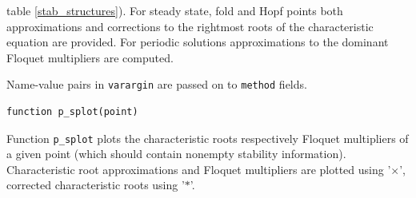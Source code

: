 \documentclass[10pt]{scrartcl}
\newcommand{\blist}[1]{\mbox{\lstinline!#1!}}
\begin{document}
{\begin{itemize}
  table \ref{stab_structures}).  For steady state, fold and Hopf
  points both approximations and corrections to the rightmost roots of
  the characteristic equation are provided.  For periodic solutions
  approximations to the dominant Floquet multipliers are computed.
\end{itemize}
Name-value pairs in \blist{varargin} are passed on to \blist{method} fields.
\begin{lstlisting}
function p_splot(point)  
\end{lstlisting}
\noindent Function \blist{p_splot} plots the characteristic roots
respectively Floquet multipliers of a given point (which should
contain nonempty stability information).  Characteristic root
approximations and Floquet multipliers are plotted using '$\times$',
corrected characteristic roots using '$*$'.



}
\end{document}
